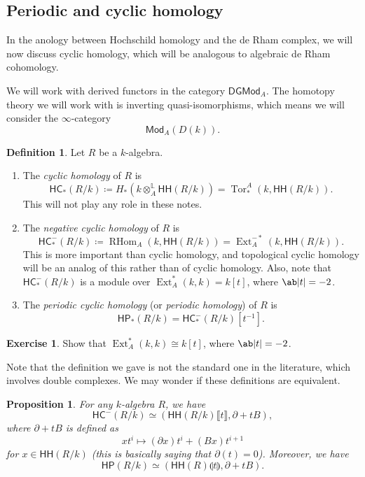 \documentclass[10pt]{amsart}
\newtheorem{prop}[thm]{Proposition}
\theoremstyle{definition}
\newtheorem{defn}[thm]{Definition}
\newtheorem{exer}[thm]{Exercise}
\theoremstyle{remark}
\theoremstyle{plain}
\theoremstyle{definition}
\theoremstyle{remark}
\renewcommand{\L}{\mathbb{L}}
\newcommand{\ms}[1]{\mathsf{#1}}
\newcommand{\1}{\mathbf{1}}
\newcommand{\2}{\mathbf{2}}
\newcommand{\3}{\mathbf{3}}
\newcommand{\ps}[1]{\llbracket #1 \rrbracket}
\newcommand{\ls}[1]{\llparenthesis #1 \rrparenthesis}
\newcommand{\HC}{\ms{HC}}
\newcommand{\HH}{\ms{HH}}
\newcommand{\HP}{\ms{HP}}
\DeclareMathOperator{\Tor}{Tor}
\DeclareMathOperator{\RHom}{RHom}
\DeclareMathOperator{\Ext}{Ext}
\begin{document}
\subsection{Periodic and cyclic homology}%
\label{sub:Periodic and cyclic homology}

In the anology between Hochschild homology and the de Rham complex, we will now discuss cyclic homology, which will be analogous to algebraic de Rham cohomology.

We will work with derived functors in the category $\ms{DGMod}_A$. The homotopy theory we will work with is inverting quasi-isomorphisms, which means we will consider the $\infty$-category
\[ \ms{Mod}_A(D(k)). \]

\begin{defn}
    Let $R$ be a $k$-algebra.
    \begin{enumerate}
        \item The \textit{cyclic homology} of $R$ is
        \[ \HC_*(R/k) \coloneqq H_*(k \otimes_A^{\L} \HH(R/k)) = \Tor_*^A(k, \HH(R/k)). \]
        This will not play any role in these notes.
        \item The \textit{negative cyclic homology} of $R$ is
        \[ \HC_*^-(R/k) \coloneqq \RHom_A(k, \HH(R/k)) = \Ext_A^{-*}(k, \HH(R/k)). \]
        This is more important than cyclic homology, and topological cyclic homology will be an analog of this rather than of cyclic homology. Also, note that $\HC_*^-(R/k)$ is a module over $\Ext_A^{*}(k,k) = k[t]$, where $\ab|t| = -2$.
        \item The \textit{periodic cyclic homology} (or \textit{periodic homology}) of $R$ is
        \[ \HP_*(R/k) = \HC_*^-(R/k) [t^{-1}]. \]
    \end{enumerate}
\end{defn}

\begin{exer}
    Show that $\Ext_A^*(k,k) \cong k[t]$, where $\ab|t| = -2$.
\end{exer}

Note that the definition we gave is not the standard one in the literature, which involves double complexes. We may wonder if these definitions are equivalent.

\begin{prop}
    For any $k$-algebra $R$, we have
    \[ \HC^-(R/k) \simeq (\HH(R/k)\ps{t}, \partial + tB), \]
    where $\partial + tB$ is defined as
    \[ xt^i \mapsto (\partial x) t^i + (Bx) t^{i+1} \]
    for $x \in \HH(R/k)$ (this is basically saying that $\partial(t) = 0$). Moreover, we have
    \[ \HP(R/k) \simeq (\HH(R)\ls{t}, \partial + tB). \]
\end{prop}
\end{document}
